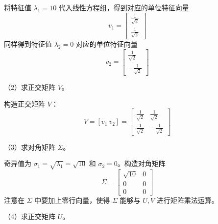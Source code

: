 \documentclass[UTF8,12pt,a4paper,fontset=fandol]{ctexart}
\begin{document}
将特征值 $\lambda_1=10$ 代入线性方程组，得到对应的单位特征向量
\[
v_1=\begin{bmatrix}\frac{1}{\sqrt2}\\[2mm]\frac{1}{\sqrt2}\end{bmatrix}
\]
同样得到特征值 $\lambda_2=0$ 对应的单位特征向量
\[
v_2=\begin{bmatrix}\frac{1}{\sqrt2}\\[2mm]-\frac{1}{\sqrt2}\end{bmatrix}
\]

（2）求正交矩阵 $V$。

构造正交矩阵 $V$：
\[
V=[v_1\ v_2]=
\begin{bmatrix}
\frac{1}{\sqrt2}&\frac{1}{\sqrt2}\\[2mm]
\frac{1}{\sqrt2}&-\frac{1}{\sqrt2}
\end{bmatrix}
\]

（3）求对角矩阵 $\Sigma$。

奇异值为 $\sigma_1=\sqrt{\lambda_1}=\sqrt{10}$ 和 $\sigma_2=0$。构造对角矩阵
\[
\Sigma=
\begin{bmatrix}
\sqrt{10}&0\\
0&0\\
0&0
\end{bmatrix}
\]
注意在 $\Sigma$ 中要加上零行向量，使得 $\Sigma$ 能够与 $U,V$ 进行矩阵乘法运算。

（4）求正交矩阵 $U$。
\end{document}
